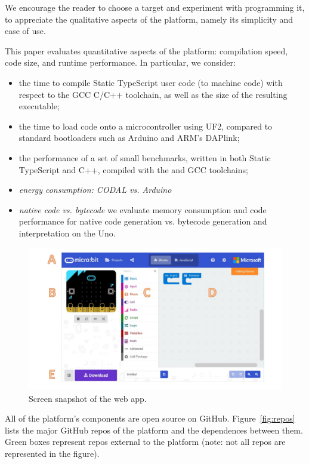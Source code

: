 We encourage the reader to choose a target
and experiment with programming it, to appreciate the 
qualitative aspects of the platform, namely its simplicity and ease of use.  

This paper evaluates quantitative aspects of the platform: 
compilation speed, code size, and runtime performance.  In particular, we 
consider:
\begin{itemize}
\item the time to compile Static TypeScript user code (to machine code) with respect 
      to the GCC C/C++ toolchain, as well as the size of the resulting executable;
\item the time to load code onto a microcontroller using UF2, compared to standard bootloaders
      such as Arduino and ARM's DAPlink; 
\item the performance of a set of small benchmarks, written in both Static TypeScript and C++,
      compiled with the \MC and GCC toolchains;
\item \emph{energy consumption: CODAL vs. Arduino}
\item \emph{native code vs. bytecode} we
      evaluate memory consumption and code performance for native code generation 
      vs. bytecode generation and interpretation on the Uno.
\end{itemize}


\begin{figure}[t]
      \includegraphics[width=5in]{screenSnapFig.pdf}
  \caption{\label{fig:screenSnap}Screen snapshot of the \MC web app.}
\end{figure}

All of the platform's components are open source on GitHub.
Figure~\ref{fig:repos} lists the major GitHub repos of the platform
and the dependences between them. Green boxes represent repos external to the platform
(note: not all repos are represented in the figure).

